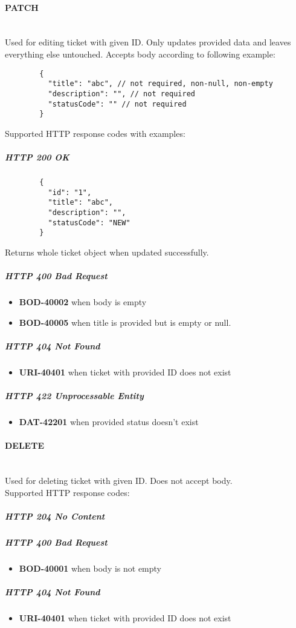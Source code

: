 \documentclass[a4paper]{article}
\newcommand{\newLineParagraph}[1]{\paragraph{#1}\mbox{}\\}
\begin{document}
    \newLineParagraph{PATCH}
    Used for editing ticket with given ID. Only updates provided data and leaves everything else untouched. Accepts body according to following example:
    \begin{verbatim}
        {
          "title": "abc", // not required, non-null, non-empty
          "description": "", // not required
          "statusCode": "" // not required
        }
    \end{verbatim}
    Supported HTTP response codes with examples:
    \subparagraph{HTTP 200 OK}
    \begin{verbatim}
        {
          "id": "1",
          "title": "abc",
          "description": "",
          "statusCode": "NEW"
        }
    \end{verbatim}
    Returns whole ticket object when updated successfully.
    \subparagraph{HTTP 400 Bad Request}
    \begin{itemize}
        \item \textbf{BOD-40002} when body is empty
        \item \textbf{BOD-40005} when title is provided but is empty or null.
    \end{itemize}
    \subparagraph{HTTP 404 Not Found}
    \begin{itemize}
        \item \textbf{URI-40401} when ticket with provided ID does not exist
    \end{itemize}
    \subparagraph{HTTP 422 Unprocessable Entity}
    \begin{itemize}
        \item \textbf{DAT-42201} when provided status doesn't exist
    \end{itemize}

    \newLineParagraph{DELETE}
    Used for deleting ticket with given ID. Does not accept body. \\
    Supported HTTP response codes:
    \subparagraph{HTTP 204 No Content}
    \subparagraph{HTTP 400 Bad Request}
    \begin{itemize}
        \item \textbf{BOD-40001} when body is not empty
    \end{itemize}
    \subparagraph{HTTP 404 Not Found}
    \begin{itemize}
        \item \textbf{URI-40401} when ticket with provided ID does not exist
    \end{itemize}
\end{document}
